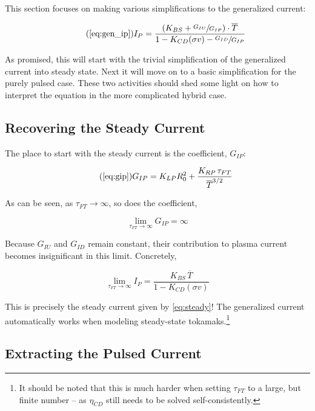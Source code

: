 This section focuses on making various simplifications to the generalized current:

\begin{equation}
	\tag{\ref{eq:gen_ip}}
	I_P = \frac{ \left( K_{BS} + \sfrac{ G_{IU} }{ G_{IP} } \right) \cdot \overline T }{ 1 - K_{CD} ( \sigma v ) - \sfrac{ G_{ID} }{ G_{IP} } }
\end{equation}

As promised, this will start with the trivial simplification of the generalized current into steady state. Next it will move on to a basic simplification for the purely pulsed case. These two activities should shed some light on how to interpret the equation in the more complicated hybrid case.

\subsection{Recovering the Steady Current}

The place to start with the steady current is the  coefficient, $G_{IP}$:

\begin{equation}
	\tag{\ref{eq:gip}}
	G_{IP} = K_{LP} R_0^2 + \frac{ K_{RP} \, \tau_{FT} }{ \overline T ^ {3/2} }
\end{equation}

As can be seen, as $\tau_{FT} \to \infty$, so does the coefficient,

\begin{equation}
	\lim_{\tau_{FT} \to \infty} G_{IP} = \infty
\end{equation}

Because $G_{IU}$ and $G_{ID}$ remain constant, their contribution to plasma current becomes insignificant in this limit. Concretely,

\begin{equation}
	\label{eq:tau_inf}
	\lim_{\tau_{FT} \to \infty} I_P = \frac{ K_{BS} \, \overline T }{ 1 - K_{CD} ( \sigma v ) }
\end{equation}

This is precisely the steady current given by \cref{eq:steady}! The generalized current automatically works when modeling steady-state tokamaks.\footnote{ It should be noted that this is much harder when setting $\tau_{FT}$ to a large, but finite number -- as $\eta_{CD}$ still needs to be solved self-consistently. }

\subsection{Extracting the Pulsed Current}

